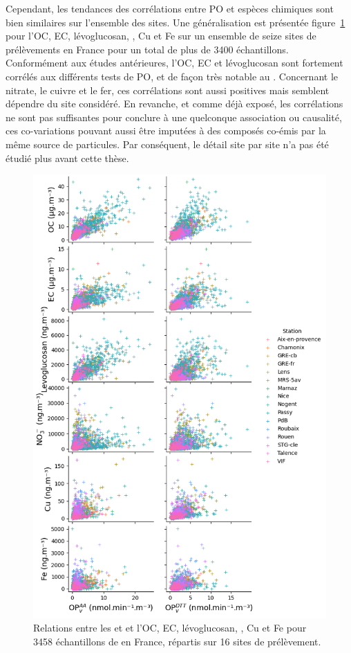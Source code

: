 Cependant, les tendances des corrélations entre PO et espèces chimiques sont bien
similaires sur l'ensemble des sites. Une généralisation est présentée
figure~\ref{fig:pairplotOPs} pour l'OC, EC, lévoglucosan, \NOt, Cu et Fe sur un ensemble
de seize sites de prélèvements en France pour un total de plus de 3400 échantillons.
Conformément aux études antérieures, l'OC, EC et lévoglucosan sont fortement corrélés
aux différents tests de PO, et de façon très notable au \POAAv. Concernant le nitrate,
le cuivre et le fer, ces corrélations sont aussi positives mais semblent dépendre du
site considéré.
En revanche, et comme déjà exposé, les corrélations ne sont pas suffisantes pour conclure
à une quelconque association ou causalité, ces co-variations pouvant aussi être imputées à
des composés co-émis par la même source de particules. 
Par conséquent, le détail site par site n'a pas été étudié plus avant cette thèse.

\begin{figure}[ht]
    \centering
    \includegraphics[width=0.7\linewidth]{figures/chapter04/pairplot_OPs.png}
    \caption{Relations entre les \POAAv{} et \PODTTv{} et l'OC, EC, lévoglucosan, \NOt, Cu et Fe pour
    3458 échantillons de \PMdix{} en France, répartis sur 16 sites de prélèvement.}%
    \label{fig:pairplotOPs}
\end{figure}

